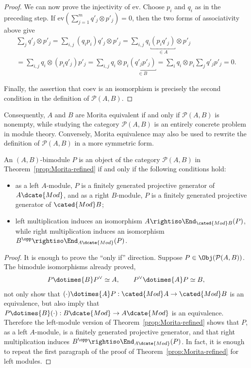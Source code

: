 \begin{proof}
	We can now prove the injectivity of $\mathrm{ev}$. Choose $p_i$ and $q_i$
	as in the preceding step. If
	$\mathrm{ev}(\sum_{j=1}^m q'_j\otimes p'_j)=0$, then the two forms of
	associativity above give
	\begin{multline*}
		\sum_j q'_j \otimes p'_j
		= \sum_{i,j}(q_i p_i)q'_j\otimes p'_j
		= \sum_{i,j}q_i\underbracket{(p_iq'_j)}_{\in A}\otimes p'_j \\
		= \sum_{i,j}q_i\otimes(p_iq'_j)p'_j
		= \sum_{i,j}q_i\otimes p_i\underbracket{(q'_jp'_j)}_{\in B}
		= \sum_i q_i\otimes p_i\sum_j q'_jp'_j=0.
	\end{multline*}

	Finally, the assertion that $\mathrm{coev}$ is an isomorphism is precisely
	the second condition in the definition of $\mathcal{P}(A,B)$.
\end{proof}

Consequently, $A$ and $B$ are Morita equivalent if and only if
$\mathcal{P}(A,B)$ is nonempty, while studying the category
$\mathcal{P}(A,B)$ is an entirely concrete problem in module theory.
Conversely, Morita equivalence may also be used to rewrite the definition of
$\mathcal{P}(A,B)$ in a more symmetric form.

\begin{corollary}\label{prop:Morita-refined-symm}
	An $(A,B)$-bimodule $P$ is an object of the category
	$\mathcal{P}(A,B)$ in Theorem~\ref{prop:Morita-refined} if and only if the
	following conditions hold:
	\begin{itemize}
		\item as a left $A$-module, $P$ is a finitely generated projective
		generator of $A\dcate{Mod}$, and as a right $B$-module, $P$ is a
		finitely generated projective generator of $\cated{Mod}B$;
		\item left multiplication induces an isomorphism
		$A\rightiso\End_{\cated{Mod}B}(P)$, while right multiplication
		induces an isomorphism
		$B^{\opp}\rightiso\End_{A\dcate{Mod}}(P)$.
	\end{itemize}
\end{corollary}
\begin{proof}
	It is enough to prove the ``only if'' direction. Suppose
	$P\in\Obj(\mathcal{P}(A,B))$. The bimodule isomorphisms already proved,
	\[
	P\dotimes{B}P^\vee\simeq A,\qquad
	P^\vee\dotimes{A}P\simeq B,
	\]
	not only show that
	$(\cdot)\dotimes{A}P:\cated{Mod}A\to\cated{Mod}B$ is an equivalence,
	but also imply that
	$P\dotimes{B}(\cdot):B\dcate{Mod}\to A\dcate{Mod}$ is an equivalence.
	Therefore the left-module version of Theorem~\ref{prop:Morita-refined}
	shows that $P$, as a left $A$-module, is a finitely generated projective
	generator, and that right multiplication induces
	$B^{\opp}\rightiso\End_{A\dcate{Mod}}(P)$. In fact, it is enough to
	repeat the first paragraph of the proof of
	Theorem~\ref{prop:Morita-refined} for left modules.
\end{proof}

